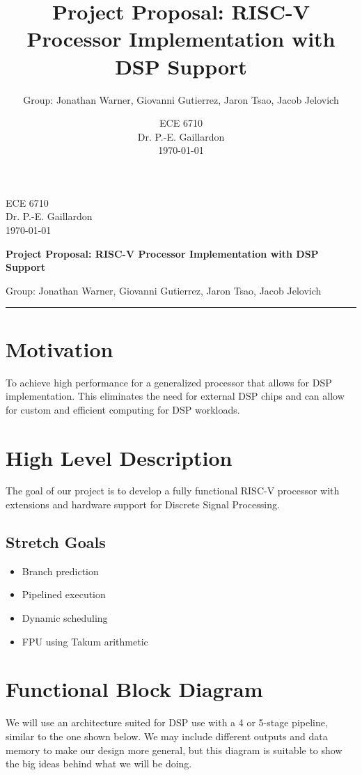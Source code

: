 \documentclass[12pt]{article}
\title{Project Proposal: RISC-V Processor Implementation with DSP Support}
\author{Group: Jonathan Warner, Giovanni Gutierrez, Jaron Tsao, Jacob Jelovich}
\date{ECE 6710 \\ Dr. P.-E. Gaillardon \\ \today }
\begin{document}
\begin{flushleft}
    {ECE 6710 \\ Dr. P.-E. Gaillardon \\ \today} \\[2em]
\end{flushleft}
\begin{center}
    \textbf{Project Proposal: RISC-V Processor Implementation with DSP Support} \\[2em]
\end{center}

\begin{flushleft}
    {Group: Jonathan Warner, Giovanni Gutierrez, Jaron Tsao, Jacob Jelovich}
\end{flushleft}
\hrule
\vspace{1em}

\section*{Motivation}
To achieve high performance for a generalized processor that allows for DSP implementation.  This eliminates the need for external DSP chips and can allow for custom and efficient computing for DSP workloads.

\section*{High Level Description}
The goal of our project is to develop a fully functional RISC-V processor with extensions and hardware support for Discrete Signal Processing.

\subsection*{Stretch Goals}

\begin{itemize}
    \item Branch prediction
    \item Pipelined execution
    \item Dynamic scheduling
    \item FPU using Takum arithmetic \cite{hunhold2024beatingpositsgametakum}
\end{itemize}

\section*{Functional Block Diagram}
We will use an architecture suited for DSP use with a 4 or 5-stage pipeline, similar to the one shown below. We may include different outputs and data memory to make our design more general, but this diagram is suitable to show the big ideas behind what we will be doing.
\end{document}
